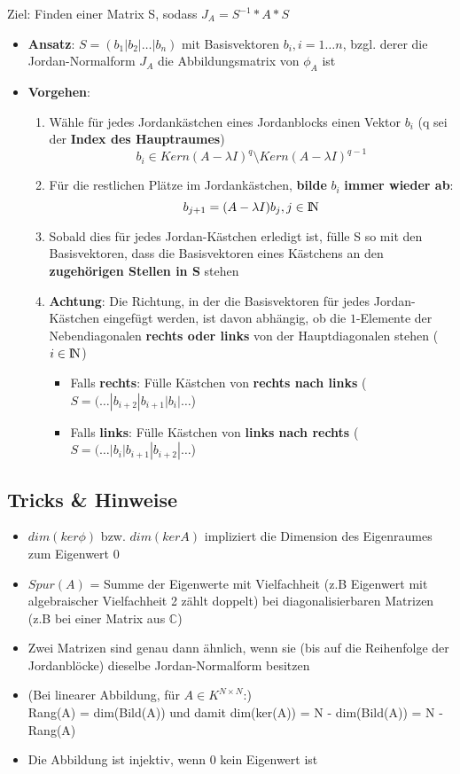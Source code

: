 \documentclass[10pt,a4paper]{article}
\def\naturalnumbers{{\rm I\!N}}
\def\complexnumbers{{\mathbb{C}}}
\begin{document}
	Ziel: Finden einer Matrix S, sodass $J_A = S^{-1} * A * S$
	\begin{itemize}
		\item \textbf{Ansatz}: $S = (b_1 | b_2 | \dots | b_n)$ mit Basisvektoren $b_i, i = 1 \dots n$, bzgl. derer die Jordan-Normalform $J_A$ die Abbildungsmatrix von $\phi_A$ ist
		\item \textbf{Vorgehen}:
		\begin{enumerate}
			\item Wähle für jedes Jordankästchen eines Jordanblocks einen Vektor $b_i$ (q sei der \textbf{Index des Hauptraumes}) $$b_i \in Kern(A - \lambda I)^q \setminus Kern(A - \lambda I)^{q-1}$$
			\item Für die restlichen Plätze im Jordankästchen, \textbf{bilde} $b_i$ \textbf{immer wieder ab}: $$b_{j+1} = (A - \lambda I)b_j, j \in \naturalnumbers$$
			\item Sobald dies für jedes Jordan-Kästchen erledigt ist, fülle S so mit den Basisvektoren, dass die Basisvektoren eines Kästchens an den \textbf{zugehörigen Stellen in S} stehen
			\item \textbf{Achtung}: Die Richtung, in der die Basisvektoren für jedes Jordan-Kästchen eingefügt werden, ist davon abhängig, ob die $1$-Elemente der Nebendiagonalen \textbf{rechts oder links} von der Hauptdiagonalen stehen ($i \in \naturalnumbers$)
			\begin{itemize}
				\item Falls \textbf{rechts}: Fülle Kästchen von \textbf{rechts nach links} ($S = (\dots | b_{i+2} | b_{i+1} | b_{i} | \dots$)
				\item Falls \textbf{links}: Fülle Kästchen von \textbf{links nach rechts} ($S = (\dots | b_{i} | b_{i+1} | b_{i+2} | \dots$)
			\end{itemize}
		\end{enumerate}
	\end{itemize}

	\subsection{Tricks \& Hinweise}
	\label{jd:sub:tricks}
	
	\begin{itemize}
		\item $dim(ker \phi)$ bzw. $dim(ker A)$ impliziert die Dimension des Eigenraumes zum Eigenwert 0
		\item $Spur(A)$ = Summe der Eigenwerte mit Vielfachheit (z.B Eigenwert mit algebraischer Vielfachheit 2 zählt doppelt) bei diagonalisierbaren Matrizen (z.B bei einer Matrix aus $\complexnumbers$)
		\item Zwei Matrizen sind genau dann ähnlich, wenn sie (bis auf die Reihenfolge der Jordanblöcke) dieselbe Jordan-Normalform besitzen
		\item (Bei linearer Abbildung, für $A \in K^{N\times N}$:)\\Rang(A) = dim(Bild(A)) und damit dim(ker(A)) = N - dim(Bild(A)) = N - Rang(A)
		\item Die Abbildung ist injektiv, wenn 0 kein Eigenwert ist
	\end{itemize}
	
\end{document}
